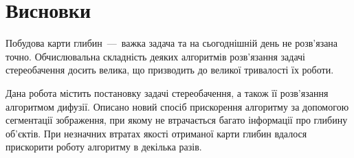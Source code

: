\chapter*{Висновки}

Побудова карти глибин~---~важка задача та
на сьогоднішній день не розв'язана точно.
Обчислювальна складність деяких алгоритмів розв'язання задачі стереобачення
досить велика, що призводить до великої тривалості їх роботи.

Дана робота містить постановку задачі стереобачення,
а також її розв'язання алгоритмом дифузії.
Описано новий спосіб прискорення алгоритму за допомогою сегментації зображення,
при якому не втрачається багато інформації про глибину об'єктів.
При незначних втратах якості отриманої карти глибин вдалося прискорити
роботу алгоритму в декілька разів.

